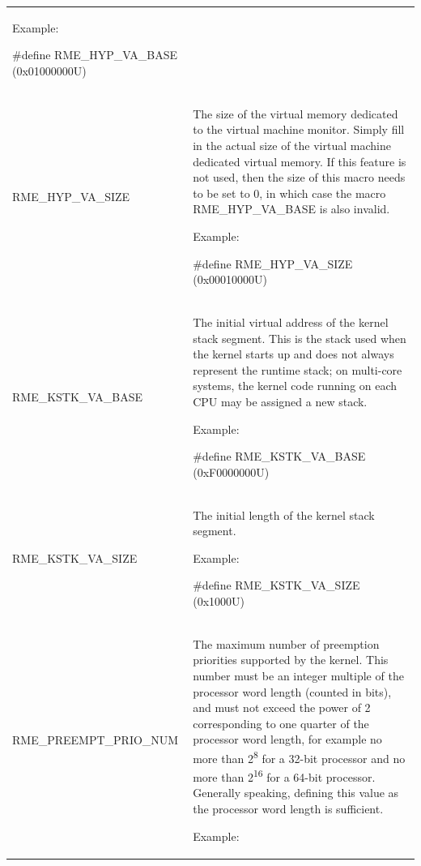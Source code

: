 \begin{xltabular}{\textwidth}{@{}>{\hsize\raggedright\arraybackslash}X>{\hsize\raggedright\arraybackslash}X@{}}
Example:

\#define RME\_HYP\_VA\_BASE (0x01000000U)\strut
\tabularnewline
RME\_HYP\_VA\_SIZE\strut
 & The size of the virtual memory dedicated to the virtual machine monitor. Simply fill in the actual size of the virtual machine dedicated virtual memory. If this feature is not used, then the size of this macro needs to be set to 0, in which case the macro RME\_HYP\_VA\_BASE is also invalid.

Example:

\#define RME\_HYP\_VA\_SIZE (0x00010000U)\strut
\tabularnewline
RME\_KSTK\_VA\_BASE\strut
 & The initial virtual address of the kernel stack segment. This is the stack used when the kernel starts up and does not always represent the runtime stack; on multi-core systems, the kernel code running on each CPU may be assigned a new stack.

Example:

\#define RME\_KSTK\_VA\_BASE (0xF0000000U)\strut
\tabularnewline
RME\_KSTK\_VA\_SIZE\strut
 & The initial length of the kernel stack segment.

Example:

\#define RME\_KSTK\_VA\_SIZE (0x1000U)\strut
\tabularnewline
RME\_PREEMPT\_PRIO\_NUM\strut
 & The maximum number of preemption priorities supported by the kernel. This number must be an integer multiple of the processor word length (counted in bits), and must not exceed the power of 2 corresponding to one quarter of the processor word length, for example no more than 2\textsuperscript{8} for a 32-bit processor and no more than 2\textsuperscript{16} for a 64-bit processor. Generally speaking, defining this value as the processor word length is sufficient.

Example:


\end{xltabular}
